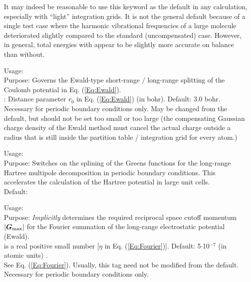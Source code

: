It may indeed be reasonable to use this keyword as the default in any 
calculation, especially with ``light'' integration grids. It is not the
general default because of a single test case where the harmonic vibrational 
frequencies of a large molecule deteriorated slightly compared to the
standard (uncompensated) case. However, in general, total energies with 
 appear to be slightly more accurate
on balance than without. 

{
  \noindent
  Usage:  
    \\[1.0ex]
  Purpose: Governs the Ewald-type short-range / long-range splitting
    of the Coulomb potential in Eq. (\ref{Eq:Ewald}). \\[1.0ex]
   : Distance parameter $r_0$ in Eq. (\ref{Eq:Ewald})
    (in bohr). Default: 3.0 bohr. \\
}
Necessary for periodic boundary conditions only. May be changed from
the default, but should not be set too small or too large (the compensating
Gaussian charge density of the Ewald method must cancel the actual charge
outside a
radius that is still inside the partition table / integration grid for every
atom.) 

{
  \noindent
  Usage:   \\[1.0ex]
  Purpose: Switches on the splining of the Greens functions for the
  long-range Hartree multipole decomposition in periodic boundary
  conditions. This accelerates the calculation of the Hartree
  potential in large unit cells. \\[1.0ex]
  Default: 
}


{
  \noindent
  Usage: 
     \\[1.0ex]
  Purpose: \emph{Implicitly} determines the required reciprocal space
    cutoff momentum $|\mbox{\boldmath$G$}_\text{max}|$ for the Fourier summation of
    the long-range electrostatic potential (Ewald). \\[1.0ex]
   is a real positive small number [$\eta$ in
    Eq. (\ref{Eq:Fourier})]. Default: 5$\cdot$10$^{-7}$ (in atomic
    units) . \\
}
See Eq. (\ref{Eq:Fourier}). Usually, this tag need not be modified from the
default. Necessary for periodic boundary conditions only.  

